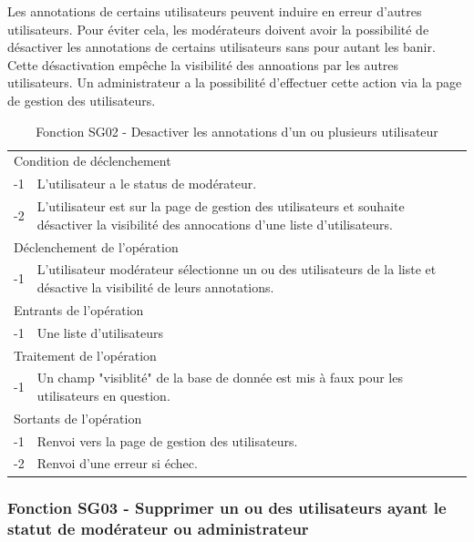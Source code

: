 \documentclass[a4paper]{article}
\begin{document}
Les annotations de certains utilisateurs peuvent induire en erreur d'autres utilisateurs. Pour éviter cela, les modérateurs doivent avoir la possibilité de désactiver les annotations de certains utilisateurs sans pour autant les banir. Cette désactivation empêche la visibilité des annoations par les autres utilisateurs. Un administrateur a la possibilité d'effectuer cette action via la page de gestion des utilisateurs. 

\begin{table}[H]
  \centering
   \small
	\begin{tabular}{|c|p{12cm}|}
   		\hline
   			\rowcolor{lightgray}\multicolumn{2}{|c|}{\textbf{Fonction SG02 - Desactiver les annotations d'un ou plusieurs utilisateur}} \\
   		\hline
   			\multicolumn{2}{|l|}{Condition de déclenchement} \\
   		\hline
   			-1 & L'utilisateur a le status de modérateur.\\
        	-2 & L'utilisateur est sur la page de gestion des utilisateurs et souhaite désactiver la visibilité des annocations d'une liste d'utilisateurs.\\
   		\hline
   			\multicolumn{2}{|l|}{Déclenchement de l'opération} \\
   		\hline
   			-1 & L'utilisateur modérateur sélectionne un ou des utilisateurs de la liste et désactive la visibilité de leurs annotations.\\
   		\hline
   			\multicolumn{2}{|l|}{Entrants de l'opération} \\
   		\hline
   			-1 & Une liste d'utilisateurs\\
   		\hline
   			\multicolumn{2}{|l|}{Traitement de l'opération} \\
  		\hline
   			-1 & Un champ "visiblité" de la base de donnée est mis à faux pour les utilisateurs en question.\\
   		\hline
   			\multicolumn{2}{|l|}{Sortants de l'opération} \\
   		\hline
   			-1 & Renvoi vers la page de gestion des utilisateurs.\\
        	-2 & Renvoi d'une erreur si échec.\\
   		\hline
	\end{tabular}
  \caption{Fonction SG02 - Desactiver les annotations d'un ou plusieurs utilisateur}
  \normalsize
  \label{tab: desactiver_utilisateur}
\end{table}

\subsubsection{Fonction SG03 - Supprimer un ou des utilisateurs ayant le statut de modérateur ou administrateur}
\end{document}
